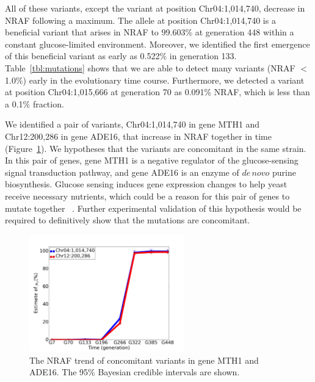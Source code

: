 \documentclass[11pt,reqno]{amsart}
\begin{document}
All of these variants, except the variant at position Chr04:1,014,740, decrease in NRAF following a maximum.
The allele at position Chr04:1,014,740 is a beneficial variant that arises in NRAF to 99.603\% at generation 448 within a constant glucose-limited environment.
Moreover, we identified the first emergence of this beneficial variant as early as 0.522\% in generation 133.
Table~\ref{tbl:mutations} shows that we are able to detect many variants (NRAF $<$ 1.0\%) early in the evolutionary time course.
Furthermore, we detected a variant at position Chr04:1,015,666 at generation 70 as 0.091\% NRAF, which is less than a 0.1\% fraction.

We identified a pair of variants, Chr04:1,014,740 in gene MTH1 and Chr12:200,286 in gene ADE16, that increase in NRAF together in time (Figure~\ref{tbl:concomitant}).
We hypotheses that the variants are concomitant in the same strain.
In this pair of genes, gene MTH1 is a negative regulator of the glucose-sensing signal transduction pathway, and gene ADE16 is an enzyme of $\mathit{de\, novo}$ purine biosynthesis.
Glucose sensing induces gene expression changes to help yeast receive necessary nutrients, which could be a reason for this pair of genes to mutate together ~\citep{johnston1999feasting}.
Further experimental validation of this hypothesis would be required to definitively show that the mutations are concomitant.
\begin{figure}[htbp]
\centering
\includegraphics[width=0.6\textwidth]{figs/concomitant.png}
\caption{The NRAF trend of concomitant variants in gene MTH1 and ADE16.
The 95\% Bayesian credible intervals are shown.}
\label{tbl:concomitant}
\end{figure}
\end{document}
